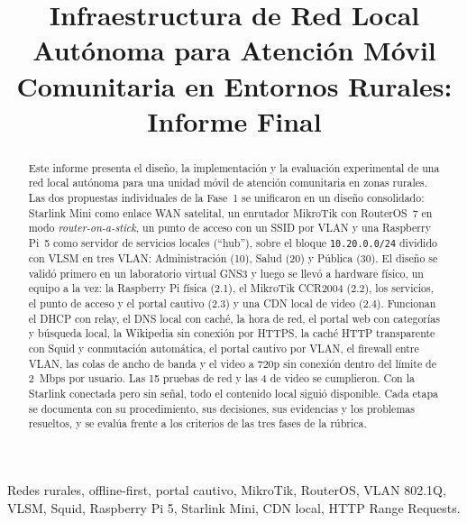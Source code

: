 \documentclass[conference]{IEEEtran}
\begin{document}
\title{Infraestructura de Red Local Autónoma para Atención Móvil Comunitaria en Entornos Rurales: Informe Final}

\author{
}

\maketitle

\begin{abstract}
Este informe presenta el diseño, la implementación y la evaluación experimental de una red local autónoma para una unidad móvil de atención comunitaria en zonas rurales. Las dos propuestas individuales de la Fase~1 se unificaron en un diseño consolidado: Starlink Mini como enlace WAN satelital, un enrutador MikroTik con RouterOS~7 en modo \textit{router-on-a-stick}, un punto de acceso con un SSID por VLAN y una Raspberry Pi~5 como servidor de servicios locales (``hub''), sobre el bloque \texttt{10.20.0.0/24} dividido con VLSM en tres VLAN: Administración (10), Salud (20) y Pública (30). El diseño se validó primero en un laboratorio virtual GNS3 y luego se llevó a hardware físico, un equipo a la vez: la Raspberry Pi física (2.1), el MikroTik CCR2004 (2.2), los servicios, el punto de acceso y el portal cautivo (2.3) y una CDN local de video (2.4). Funcionan el DHCP con relay, el DNS local con caché, la hora de red, el portal web con categorías y búsqueda local, la Wikipedia sin conexión por HTTPS, la caché HTTP transparente con Squid y conmutación automática, el portal cautivo por VLAN, el firewall entre VLAN, las colas de ancho de banda y el video a 720p sin conexión dentro del límite de 2~Mbps por usuario. Las 15 pruebas de red y las 4 de video se cumplieron. Con la Starlink conectada pero sin señal, todo el contenido local siguió disponible. Cada etapa se documenta con su procedimiento, sus decisiones, sus evidencias y los problemas resueltos, y se evalúa frente a los criterios de las tres fases de la rúbrica.
\end{abstract}

\begin{IEEEkeywords}
Redes rurales, offline-first, portal cautivo, MikroTik, RouterOS, VLAN 802.1Q, VLSM, Squid, Raspberry Pi 5, Starlink Mini, CDN local, HTTP Range Requests.
\end{IEEEkeywords}
\end{document}
